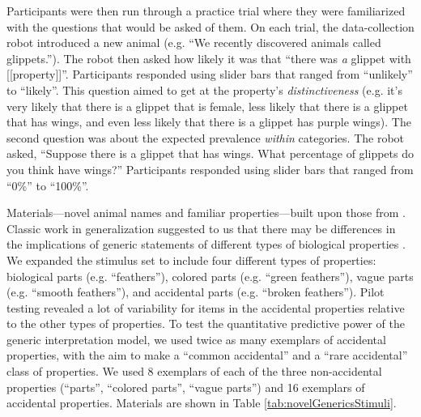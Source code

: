 \documentclass[10pt,letterpaper]{article}
\begin{document}
Participants were then run through a practice trial where they were familiarized with the questions that would be asked of them. 
On each trial, the data-collection robot introduced a new animal (e.g. ``We recently discovered animals called glippets.''). 
The robot then asked how likely it was that ``there was \emph{a} glippet with [[property]]''. 
Participants responded using slider bars that ranged from ``unlikely'' to ``likely''.
This question aimed to get at the property's \emph{distinctiveness}
(e.g. it's very likely that there is a glippet that is female, less likely that there is a glippet that has wings, and even less likely that there is a glippet has purple wings). 
The second question was about the expected prevalence \emph{within} categories. 
The robot asked, ``Suppose there is a glippet that has wings. What percentage of glippets do you think have wings?'' Participants responded using slider bars that ranged from ``0\%'' to ``100\%''.


Materials---novel animal names and familiar properties---built upon those from . 
Classic work in generalization suggested to us that there may be differences in the implications of generic statements of different types of biological properties \cite{Nisbett1983}. 
We expanded the stimulus set to include four different types of properties: biological parts (e.g. ``feathers''), colored parts (e.g. ``green feathers''), vague parts (e.g. ``smooth feathers''), and accidental parts (e.g. ``broken feathers''). 
Pilot testing revealed a lot of variability for items in the accidental properties relative to the other types of properties. 
To test the quantitative predictive power of the generic interpretation model, we used twice as many exemplars of accidental properties, with the aim to make a ``common accidental'' and a ``rare accidental'' class of properties. 
We used 8 exemplars of each of the three non-accidental properties (``parts'', ``colored parts'', ``vague parts'') and 16 exemplars of accidental properties.
Materials are shown in Table \ref{tab:novelGenericsStimuli}.
\end{document}
